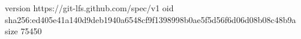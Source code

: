 version https://git-lfs.github.com/spec/v1
oid sha256:ed405e41a140d9deb1940a6548cf9f1398998b0ae5f5d56f6d06d08b08c48b9a
size 75450
